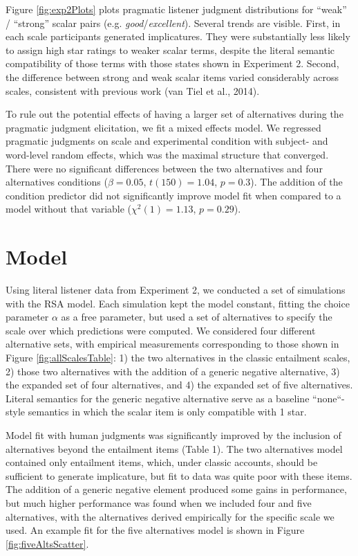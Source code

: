 \documentclass[10pt, letterpaper]{article}
\begin{document}
Figure \ref{fig:exp2Plots} plots pragmatic listener judgment
distributions for ``weak'' / ``strong'' scalar pairs (e.g.
\emph{good}/\emph{excellent}). Several trends are visible. First, in
each scale participants generated implicatures. They were substantially
less likely to assign high star ratings to weaker scalar terms, despite
the literal semantic compatibility of those terms with those states
shown in Experiment 2. Second, the difference between strong and weak
scalar items varied considerably across scales, consistent with previous
work ({van Tiel} et al., 2014).

To rule out the potential effects of having a larger set of alternatives
during the pragmatic judgment elicitation, we fit a mixed effects model.
We regressed pragmatic judgments on scale and experimental condition
with subject- and word-level random effects, which was the maximal
structure that converged. There were no significant differences between
the two alternatives and four alternatives conditions (\(\beta = 0.05\),
\(t(150) = 1.04\), \(p = 0.3\)). The addition of the condition predictor
did not significantly improve model fit when compared to a model without
that variable (\(\chi^2(1) = 1.13\), \(p = 0.29\)).

\section{Model}\label{model}

Using literal listener data from Experiment 2, we conducted a set of
simulations with the RSA model. Each simulation kept the model constant,
fitting the choice parameter \(\alpha\) as a free parameter, but used a
set of alternatives to specify the scale over which predictions were
computed. We considered four different alternative sets, with empirical
measurements corresponding to those shown in Figure
\ref{fig:allScalesTable}: 1) the two alternatives in the classic
entailment scales, 2) those two alternatives with the addition of a
generic negative alternative, 3) the expanded set of four alternatives,
and 4) the expanded set of five alternatives. Literal semantics for the
generic negative alternative serve as a baseline ``none``-style
semantics in which the scalar item is only compatible with 1 star.

Model fit with human judgments was significantly improved by the
inclusion of alternatives beyond the entailment items (Table 1). The two
alternatives model contained only entailment items, which, under classic
accounts, should be sufficient to generate implicature, but fit to data
was quite poor with these items. The addition of a generic negative
element produced some gains in performance, but much higher performance
was found when we included four and five alternatives, with the
alternatives derived empirically for the specific scale we used. An
example fit for the five alternatives model is shown in Figure
\ref{fig:fiveAltsScatter}.
\end{document}
